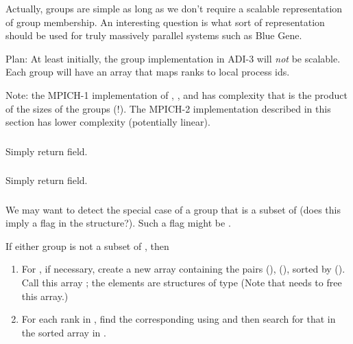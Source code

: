 \documentclass{article}
\begin{document}
Actually, groups are simple as long as we don't require a scalable
representation of group membership.  An interesting question is what
sort of representation should be used for truly massively parallel
systems such as Blue Gene.  

Plan: At least initially, the group implementation in ADI-3 will \emph{not} be
scalable.  Each group will have an array that maps ranks to local process ids.

Note: the MPICH-1 implementation of ,
, and  has complexity
that is the product of the sizes of the groups (!).  The MPICH-2
implementation described in this section has lower complexity (potentially
linear).  

\subsubsection{}
Simply return  field.

\subsubsection{}
Simply return  field.

\subsubsection{}
We may want to detect the special case of a group that is a subset of
 (does this imply a flag in the 
structure?).  Such a flag might be
. 

If either group is not a subset of , then 
\begin{enumerate}
\item For , if necessary, create a new array containing the pairs
   (), 
  (), sorted by  (). Call this array
; the elements are 
  structures of type
  (Note that  needs to free this array.)
\item For each rank in , find the corresponding  
  using  and then search for that 
  in 
  the sorted array  in .
\end{enumerate}
\end{document}
